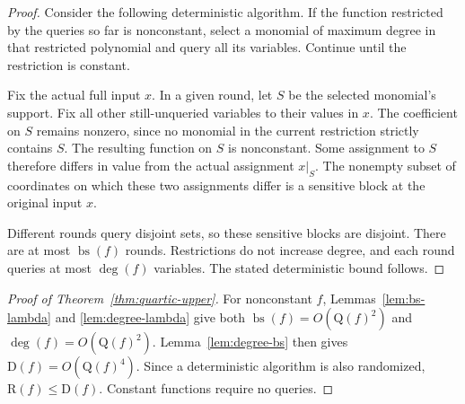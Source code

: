 \documentclass[11pt]{article}
\theoremstyle{definition}
\newcommand{\R}{\mathrm R}
\newcommand{\Q}{\mathrm Q}
\newcommand{\D}{\mathrm D}
\newcommand{\bs}{\operatorname{bs}}
\begin{document}
\begin{proof}
Consider the following deterministic algorithm. If the function
restricted by the queries so far is nonconstant, select a monomial
of maximum degree in that restricted polynomial and query all its
variables. Continue until the restriction is constant.

Fix the actual full input $x$. In a given round, let $S$ be the
selected monomial's support. Fix all other still-unqueried variables
to their values in $x$. The coefficient on $S$ remains nonzero, since
no monomial in the current restriction strictly contains $S$.
The resulting function on $S$ is nonconstant. Some assignment to $S$
therefore differs in value from the actual assignment $x|_S$. The
nonempty subset of coordinates on which these two assignments differ
is a sensitive block at the original input $x$.

Different rounds query disjoint sets, so these sensitive blocks are
disjoint. There are at most $\bs(f)$ rounds. Restrictions do not
increase degree, and each round queries at most $\deg(f)$ variables.
The stated deterministic bound follows.
\end{proof}

\begin{proof}[Proof of Theorem~\ref{thm:quartic-upper}]
For nonconstant $f$, Lemmas~\ref{lem:bs-lambda} and
\ref{lem:degree-lambda} give both $\bs(f)=O(\Q(f)^2)$ and
$\deg(f)=O(\Q(f)^2)$. Lemma~\ref{lem:degree-bs} then gives
$\D(f)=O(\Q(f)^4)$. Since a deterministic algorithm is also randomized,
$\R(f)\le\D(f)$. Constant functions require no queries.
\end{proof}



\end{document}
